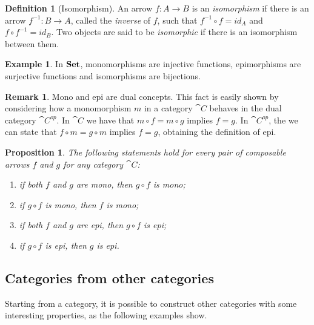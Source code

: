 \documentclass[a4paper, twoside,openright]{report}
\theoremstyle{plain}
\newtheorem{prop}[theorem]{Proposition}
\theoremstyle{definition}
\newtheorem{definition}[theorem]{Definition}
\newtheorem{example}[theorem]{Example}
\newtheorem{remark}[theorem]{Remark}
\begin{document}
\begin{definition}[Isomorphism]\label{def:iso}
    An arrow $f:A \rightarrow B$ is an \emph{isomorphism} if there is an arrow $f^{-1}:B \rightarrow A$, called the \emph{inverse} of $f$, such that $f^{-1}\circ f = id_{A}$ and $f \circ f^{-1} = id_{B}$. Two objects are said to be \emph{isomorphic} if there is an isomorphism between them.
\end{definition}

\begin{example}
    In $\mathbf{Set}$, monomorphisms are injective functions, epimorphisms are surjective functions and isomorphisms are bijections.
\end{example}

\begin{remark}
    Mono and epi are dual concepts. This fact is easily shown by considering how a monomorphism $m$ in a category $\cat C$ behaves in the dual category $\cat C^{op}$.
    In $\cat C$ we have that $m \circ f = m \circ g$ implies $f = g$. In $\cat C^{op}$, the we can state that $f \circ m = g \circ m$ implies $f = g$, obtaining the definition of epi. 
\end{remark}

\begin{prop}\label{prop:epi_mono_prop}
    The following statements hold for every pair of composable arrows $f$ and $g$ for any category $\cat C$:
    \begin{enumerate}
        \item if both $f$ and $g$ are mono, then $g \circ f$ is mono;
        \item if $g \circ f$ is mono, then $f$ is mono;
        \item if both $f$ and $g$ are epi, then $g \circ f$ is epi;
        \item if $g \circ f$ is epi, then $g$ is epi.
    \end{enumerate}
\end{prop}


\subsection{Categories from other categories}\label{ssect:cats_from_cats}

Starting from a category, it is possible to construct other categories with some interesting properties, as the following examples show.
\end{document}
